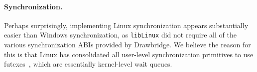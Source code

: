 




\paragraph{Synchronization.} Perhaps surprisingly, implementing Linux
synchronization appears substantially easier than Windows synchronization, 
as {\tt libLinux} did not require all of the various
synchronization ABIs provided by Drawbridge.
We believe the reason for this is that Linux has consolidated 
all user-level synchronization primitives to use futexes~\cite{franke02futex},
which are essentially kernel-level wait queues.

%


